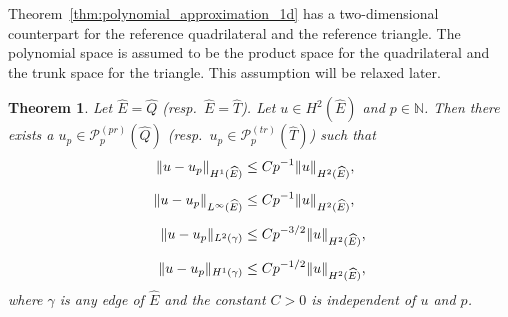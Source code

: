 \documentclass[english, 12pt, a4paper, sci, utf8, a-2b, online]{aaltothesis}
\theoremstyle{definition}
\theoremstyle{plain}
\newtheorem{theorem}{Theorem}[section]
\DeclarePairedDelimiter\norm{\lVert}{\rVert}
\numberwithin{equation}{section}
\begin{document}
Theorem~\ref{thm:polynomial_approximation_1d}
has a two-dimensional counterpart for the reference quadrilateral
and the reference triangle.
The polynomial space is assumed to be the product space for the quadrilateral
and the trunk space for the triangle. This assumption will be relaxed later.
\begin{theorem}
    \label{thm:polynomial_approximation_2d}
    Let $\widehat{E} = \widehat{Q}$ (resp.\ $\widehat{E} = \widehat{T}$).
    Let $u \in H^2(\widehat{E})$ and $p \in \mathbb{N}$.
    Then there exists a $u_p \in \mathcal{P}_p^{(pr)}(\widehat{Q})$
    (resp.\ $u_p \in \mathcal{P}_p^{(tr)}(\widehat{T})$) such that
    \begin{align}
        \label{eq:polynomial_approximation_2d_res1}
        \norm{u-u_p}_{H^1(\widehat{E})}
        &\leq C p^{-1} \norm{u}_{H^2(\widehat{E})}, \\[0.5em]
        \label{eq:polynomial_approximation_2d_res2}
        \norm{u-u_p}_{L^{\infty}(\widehat{E})}
        &\leq C p^{-1} \norm{u}_{H^2(\widehat{E})}, \\[0.5em]
        \label{eq:polynomial_approximation_2d_res3}
        \norm{u-u_p}_{L^2(\gamma)}
        &\leq C p^{-3/2} \norm{u}_{H^2(\widehat{E})}, \\[0.5em]
        \label{eq:polynomial_approximation_2d_res4}
        \norm{u-u_p}_{H^1(\gamma)}
        &\leq C p^{-1/2} \norm{u}_{H^2(\widehat{E})},
    \end{align}
    where $\gamma$ is any edge of $\widehat{E}$
    and the constant $C > 0$ is independent of $u$ and $p$.
\end{theorem}
\end{document}
